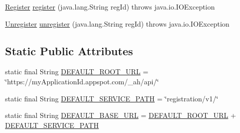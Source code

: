 \begin{DoxyCompactItemize}
\item 
\hyperlink{classcom_1_1example_1_1lusifer_1_1myapplication_1_1backend_1_1registration_1_1_registration_1_1_register}{Register} \hyperlink{classcom_1_1example_1_1lusifer_1_1myapplication_1_1backend_1_1registration_1_1_registration_a131f48ab35d49f5b003409dcad448c2b}{register} (java.\+lang.\+String reg\+Id)  throws java.\+io.\+I\+O\+Exception 
\item 
\hyperlink{classcom_1_1example_1_1lusifer_1_1myapplication_1_1backend_1_1registration_1_1_registration_1_1_unregister}{Unregister} \hyperlink{classcom_1_1example_1_1lusifer_1_1myapplication_1_1backend_1_1registration_1_1_registration_a7b56d403c4e86f9ceef1bd011c868da7}{unregister} (java.\+lang.\+String reg\+Id)  throws java.\+io.\+I\+O\+Exception 
\end{DoxyCompactItemize}
\subsection*{Static Public Attributes}
\begin{DoxyCompactItemize}
\item 
static final String \hyperlink{classcom_1_1example_1_1lusifer_1_1myapplication_1_1backend_1_1registration_1_1_registration_a0eef521b9ac939d3cdcd6246bb7d3cff}{D\+E\+F\+A\+U\+L\+T\+\_\+\+R\+O\+O\+T\+\_\+\+U\+R\+L} = \char`\"{}https\+://my\+Application\+Id.\+appspot.\+com/\+\_\+ah/api/\char`\"{}
\item 
static final String \hyperlink{classcom_1_1example_1_1lusifer_1_1myapplication_1_1backend_1_1registration_1_1_registration_a0be92fb550e3ee158bba14a7baaa120f}{D\+E\+F\+A\+U\+L\+T\+\_\+\+S\+E\+R\+V\+I\+C\+E\+\_\+\+P\+A\+T\+H} = \char`\"{}registration/v1/\char`\"{}
\item 
static final String \hyperlink{classcom_1_1example_1_1lusifer_1_1myapplication_1_1backend_1_1registration_1_1_registration_a2ee82cd715416fe03ae7f90373e13a52}{D\+E\+F\+A\+U\+L\+T\+\_\+\+B\+A\+S\+E\+\_\+\+U\+R\+L} = \hyperlink{classcom_1_1example_1_1lusifer_1_1myapplication_1_1backend_1_1registration_1_1_registration_a0eef521b9ac939d3cdcd6246bb7d3cff}{D\+E\+F\+A\+U\+L\+T\+\_\+\+R\+O\+O\+T\+\_\+\+U\+R\+L} + \hyperlink{classcom_1_1example_1_1lusifer_1_1myapplication_1_1backend_1_1registration_1_1_registration_a0be92fb550e3ee158bba14a7baaa120f}{D\+E\+F\+A\+U\+L\+T\+\_\+\+S\+E\+R\+V\+I\+C\+E\+\_\+\+P\+A\+T\+H}
\end{DoxyCompactItemize}
